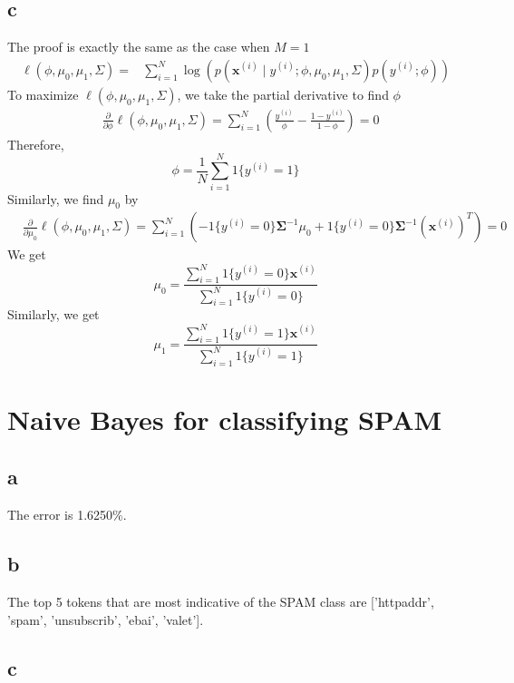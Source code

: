 \documentclass{article}
\begin{document}
\subsection*{c}

The proof is exactly the same as the case when $M = 1$
$$
\begin{aligned}
\ell(\phi, \mu_{0}, \mu_{1}, \Sigma) 
= & \sum_{i=1}^{N} \log (p(\mathbf{x}^{(i)} \mid y^{(i)} ; \phi, \mu_{0}, \mu_{1}, \Sigma) p(y^{(i)} ; \phi))
\end{aligned}
$$
To maximize $\ell(\phi, \mu_{0}, \mu_{1}, \Sigma)$, we take the partial derivative to find $\phi$
$$
\begin{aligned}
& \frac{\partial}{\partial \phi} \ell(\phi, \mu_{0}, \mu_{1}, \Sigma) =\sum_{i=1}^{N}(\frac{y^{(i)}}{\phi}-\frac{1-y^{(i)}}{1-\phi})=0
\end{aligned}
$$
Therefore,
$$
\phi = \frac{1}{N} \sum_{i=1}^{N} 1\{y^{(i)} = 1\}
$$
Similarly, we find $\mu_0$ by 
$$
\begin{aligned}
& \frac{\partial}{\partial \mu_{0}} \ell(\phi, \mu_{0}, \mu_{1}, \Sigma) = \sum_{i=1}^{N}(-1\{y^{(i)}=0\} \boldsymbol{\Sigma}^{-1} \mu_{0}+1\{y^{(i)}=0\} \mathbf{\Sigma}^{-1}(\mathbf{x}^{(i)})^{T})=0
\end{aligned}
$$
We get
$$
\mu_{0}=\frac{\sum_{i=1}^{N} 1\{y^{(i)}=0\} \mathbf{x}^{(i)}}{\sum_{i=1}^{N} 1\{y^{(i)}=0\}} 
$$
Similarly, we get
$$
\mu_{1}=\frac{\sum_{i=1}^{N} 1\{y^{(i)}=1\} \mathbf{x}^{(i)}}{\sum_{i=1}^{N} 1\{y^{(i)}=1\}}
$$

\newpage

\section{Naive Bayes for classifying SPAM}

\subsection*{a}

The error is 1.6250\%.

\subsection*{b}

The top 5 tokens that are most indicative of the SPAM class are ['httpaddr', 'spam', 'unsubscrib', 'ebai', 'valet'].

\subsection*{c}
\end{document}
